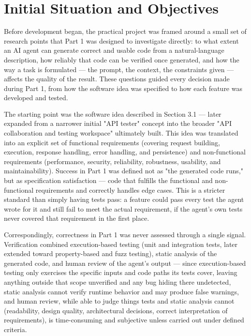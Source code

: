 \section{Initial Situation and Objectives}

Before development began, the practical project was framed around a small set of research points that Part 1 was designed to investigate directly: to what extent an AI agent can generate correct and usable code from a natural-language description, how reliably that code can be verified once generated, and how the way a task is formulated --- the prompt, the context, the constraints given --- affects the quality of the result. These questions guided every decision made during Part 1, from how the software idea was specified to how each feature was developed and tested.

The starting point was the software idea described in Section 3.1 --- later expanded from a narrower initial "API tester" concept into the broader "API collaboration and testing workspace" ultimately built. This idea was translated into an explicit set of functional requirements (covering request building, execution, response handling, error handling, and persistence) and non-functional requirements (performance, security, reliability, robustness, usability, and maintainability). Success in Part 1 was defined not as "the generated code runs," but as specification satisfaction --- code that fulfills the functional and non-functional requirements and correctly handles edge cases. This is a stricter standard than simply having tests pass: a feature could pass every test the agent wrote for it and still fail to meet the actual requirement, if the agent's own tests never covered that requirement in the first place.

Correspondingly, correctness in Part 1 was never assessed through a single signal. Verification combined execution-based testing (unit and integration tests, later extended toward property-based and fuzz testing), static analysis of the generated code, and human review of the agent's output --- since execution-based testing only exercises the specific inputs and code paths its tests cover, leaving anything outside that scope unverified and any bug hiding there undetected, static analysis cannot verify runtime behavior and may produce false warnings, and human review, while able to judge things tests and static analysis cannot (readability, design quality, architectural decisions, correct interpretation of requirements), is time-consuming and subjective unless carried out under defined criteria.

